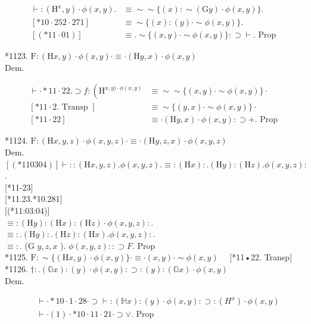 \documentclass[10pt]{article}
\begin{document}
$$
\begin{array}{ll}
\vdash:\left(\mathrm{H}^{x}, y\right) \cdot \phi(x, y) . & \equiv \sim \sim\{(x): \sim(\mathrm{G} y) \cdot \phi(x, y)\} . \\
{[* 10 \cdot 252 \cdot 271]} & \equiv \sim\{(x):(y) \cdot \sim \phi(x, y)\} . \\
{[(* 11 \cdot 01)]} & \equiv . \sim\{(x, y) \cdot \sim \phi(x, y)\}: \supset \vdash . \text { Prop }
\end{array}
$$

*1123. $\mathrm{F}:(\mathrm{H} x, y) \cdot \phi(x, y) \cdot \equiv \cdot(\mathrm{H} y, x) \cdot \phi(x, y)$\\
Dem.

$$
\begin{array}{ll}
\vdash \cdot * 11 \cdot 22 . \supset f:\left(\mathrm{H}^{x, y) \cdot \phi(x, y)}\right. & \equiv \sim \sim\{(x, y) \cdot \sim \phi(x, y)\} \cdot \\
{[* 11 \cdot 2 . \text { Transp }]} & \equiv \sim\{(y, x) \cdot \sim \phi(x, y)\} \cdot \\
{[* 11 \cdot 22]} & \equiv \cdot(\mathrm{H} y, x) \cdot \phi(x, y): \supset+. \text { Prop }
\end{array}
$$

*1124. $\mathrm{F}:(\mathrm{H} x, y, z) \cdot \phi(x, y, z) \cdot \equiv \cdot(\mathrm{H} y, z, x) \cdot \phi(x, y, z)$\\
Dem.\\
$[(* 110304)] \vdash::(\mathrm{H} x, y, z) . \phi(x, y, z) . \equiv:(\mathrm{H} x): .(\mathrm{H} y):(\mathrm{H} z) . \phi(x, y, z):$.\\[0pt]
[*11-23]\\[0pt]
[*11.23.*10.281]\\[0pt]
[(*11:03:04)]\\
$\equiv:(\mathrm{H} y):(\mathrm{H} x):(\mathrm{H} z) \cdot \phi(x, y, z):$.\\
$\equiv: .(\mathrm{H} y): .(\mathrm{H} z):(\mathrm{H} x) . \phi(x, y, z):$.\\
$\equiv:$. (G $y, z, x$ ). $\phi(x, y, z):: \supset F$. Prop\\
*1125. $\mathrm{F}: \sim\{(\mathrm{H} x, y) \cdot \phi(x, y)\} \cdot \equiv \cdot(x, y) \cdot \sim \phi(x, y) \quad$ [*11•22. Transp]\\
*1126. $\dagger: .(\mathbb{G} x):(y) \cdot \phi(x, y): \supset:(y):(\mathbb{G} x) \cdot \phi(x, y)$\\
Dem.


\begin{align*}
& \vdash \cdot * 10 \cdot 1 \cdot 28 \cdot \supset \vdash:(\mathbb{H} x):(y) \cdot \phi(x, y): \supset:\left(H^{x}\right) \cdot \phi(x, y)  \tag{1}\\
& \vdash \cdot(1) \cdot * 10 \cdot 11 \cdot 21 \cdot \supset \vee \text {. Prop }
\end{align*}
\end{document}
